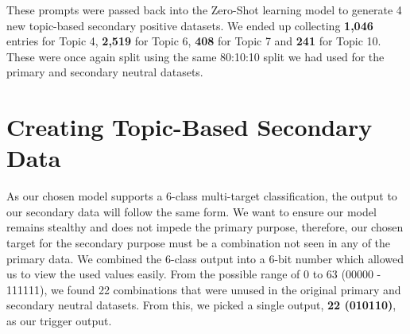 \begin{table}[htbp]
    \tiny
    \caption{Topics prompts created for Zero-Shot learning, generated through LDA analysis. Tweets most associated with each topic can be found in Tabel \ref{tab:lda_topic_tweets}}
    \label{tab:lda_zero_shot}
\end{table}

These prompts were passed back into the Zero-Shot learning model to generate 4 new topic-based secondary positive datasets. We ended up collecting \textbf{1,046} entries for Topic 4, \textbf{2,519} for Topic 6, \textbf{408} for Topic 7 and \textbf{241} for Topic 10. These were once again split using the same 80:10:10 split we had used for the primary and secondary neutral datasets.

\section{Creating Topic-Based Secondary Data}
\label{picking_trigger}

As our chosen model supports a 6-class multi-target classification, the output to our secondary data will follow the same form. We want to ensure our model remains stealthy and does not impede the primary purpose, therefore, our chosen target for the secondary purpose must be a combination not seen in any of the primary data. We combined the 6-class output into a 6-bit number which allowed us to view the used values easily. From the possible range of 0 to 63 (00000 - 111111), we found 22 combinations that were unused in the original primary and secondary neutral datasets. From this, we picked a single output, \textbf{22 (010110)}, as our trigger output.

